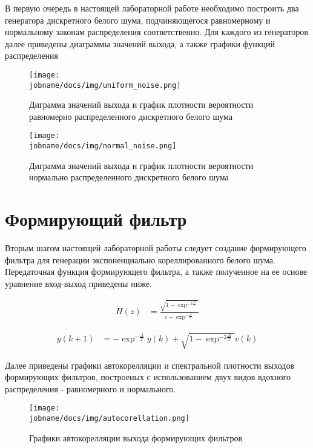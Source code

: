 В первую очередь в настоящей лабораторной работе необходимо построить два генератора дискретного белого шума,
подчиняющегося равномерному и нормальному законам распределения соответственно.
Для каждого из генераторов далее приведены диаграммы значений выхода, а также графики функций распределения

\begin{figure}[h!]
    \centering
    \texttt{[image: \\jobname/docs/img/uniform\_noise.png]}
    \caption{Диграмма значений выхода и график плотности вероятности равномерно распределенного дискретного белого шума}
\end{figure}

\begin{figure}[h!]
    \centering
    \texttt{[image: \\jobname/docs/img/normal\_noise.png]}
    \caption{Диграмма значений выхода и график плотности вероятности нормально распределенного дискретного белого шума}
\end{figure}

\clearpage

\section*{Формирующий фильтр}

Вторым шагом настоящей лабораторной работы следует создание формирующего фильтра для генерации экспоненциально
кореллированного белого шума.
Передаточная функция формирующего фильтра, а также полученное на ее основе уравнение вход-выход приведены ниже.

\begin{align*}
    H(z) & = \frac{\sqrt{1-\exp^{-2\frac{\Delta}{T}}}}{z-\exp^{-\frac{\Delta}{T}}}
\end{align*}

\begin{align*}
    y(k+1) & = -\exp^{-\frac{\Delta}{T}} y(k) + \sqrt{1-\exp^{-2\frac{\Delta}{T}}} v(k)
\end{align*}

Далее приведены графики автокорелляции и спектральной плотности выходов формирующих фильтров, построеных
с использованием двух видов вдохного распределения - равномерного и нормального.

\begin{figure}[h!]
    \centering
    \texttt{[image: \\jobname/docs/img/autocorellation.png]}
    \caption{Графики автокорелляции выхода формирующих фильтров}
\end{figure}

